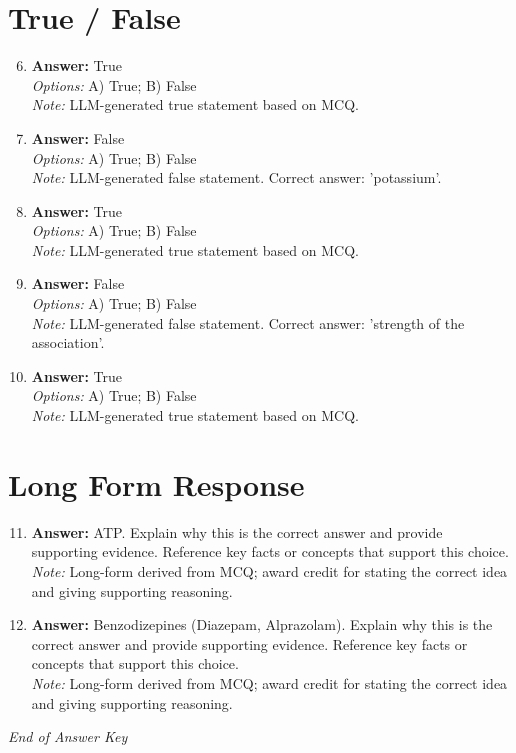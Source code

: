 \documentclass[12pt]{article}
\begin{document}
\section*{True / False}
\begin{enumerate}[label=\arabic*.]
\setcounter{enumi}{5}
\item \textbf{Answer:} True
\\ \textit{Options:} A) True; B) False
\\ \textit{Note:} LLM-generated true statement based on MCQ.
\item \textbf{Answer:} False
\\ \textit{Options:} A) True; B) False
\\ \textit{Note:} LLM-generated false statement. Correct answer: 'potassium'.
\item \textbf{Answer:} True
\\ \textit{Options:} A) True; B) False
\\ \textit{Note:} LLM-generated true statement based on MCQ.
\item \textbf{Answer:} False
\\ \textit{Options:} A) True; B) False
\\ \textit{Note:} LLM-generated false statement. Correct answer: 'strength of the association'.
\item \textbf{Answer:} True
\\ \textit{Options:} A) True; B) False
\\ \textit{Note:} LLM-generated true statement based on MCQ.
\end{enumerate}

\section*{Long Form Response}
\begin{enumerate}[label=\arabic*.]
\setcounter{enumi}{10}
\item \textbf{Answer:} ATP. Explain why this is the correct answer and provide supporting evidence. Reference key facts or concepts that support this choice.
\\ \textit{Note:} Long-form derived from MCQ; award credit for stating the correct idea and giving supporting reasoning.
\item \textbf{Answer:} Benzodizepines (Diazepam, Alprazolam). Explain why this is the correct answer and provide supporting evidence. Reference key facts or concepts that support this choice.
\\ \textit{Note:} Long-form derived from MCQ; award credit for stating the correct idea and giving supporting reasoning.
\end{enumerate}

\vfill
\noindent\textit{End of Answer Key}
\end{document}
